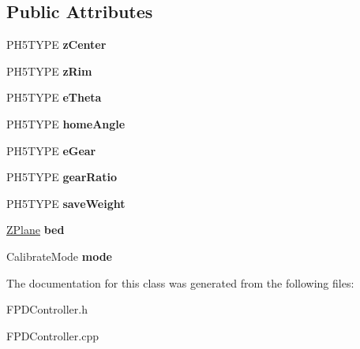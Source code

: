 \subsection*{Public Attributes}
\begin{DoxyCompactItemize}
\item 
\hypertarget{classfirestep_1_1_f_p_d_calibrate_home_aa7aa332ee4859b8646ae8cc9010c91b5}{P\+H5\+T\+Y\+P\+E {\bfseries z\+Center}}\label{classfirestep_1_1_f_p_d_calibrate_home_aa7aa332ee4859b8646ae8cc9010c91b5}

\item 
\hypertarget{classfirestep_1_1_f_p_d_calibrate_home_a012c0276dfa8cf8505490253790e5a79}{P\+H5\+T\+Y\+P\+E {\bfseries z\+Rim}}\label{classfirestep_1_1_f_p_d_calibrate_home_a012c0276dfa8cf8505490253790e5a79}

\item 
\hypertarget{classfirestep_1_1_f_p_d_calibrate_home_aabfe8245fdf7e3b80c6f0c4b18db718e}{P\+H5\+T\+Y\+P\+E {\bfseries e\+Theta}}\label{classfirestep_1_1_f_p_d_calibrate_home_aabfe8245fdf7e3b80c6f0c4b18db718e}

\item 
\hypertarget{classfirestep_1_1_f_p_d_calibrate_home_a9105696fde45b04c711c442a6392bd93}{P\+H5\+T\+Y\+P\+E {\bfseries home\+Angle}}\label{classfirestep_1_1_f_p_d_calibrate_home_a9105696fde45b04c711c442a6392bd93}

\item 
\hypertarget{classfirestep_1_1_f_p_d_calibrate_home_a386dd3229fe6b64d25150494048de8bf}{P\+H5\+T\+Y\+P\+E {\bfseries e\+Gear}}\label{classfirestep_1_1_f_p_d_calibrate_home_a386dd3229fe6b64d25150494048de8bf}

\item 
\hypertarget{classfirestep_1_1_f_p_d_calibrate_home_a15d05910bee5d2726f30b9c54f670ef8}{P\+H5\+T\+Y\+P\+E {\bfseries gear\+Ratio}}\label{classfirestep_1_1_f_p_d_calibrate_home_a15d05910bee5d2726f30b9c54f670ef8}

\item 
\hypertarget{classfirestep_1_1_f_p_d_calibrate_home_ae1fc3c7c8d9ab0621b84da772272b4a2}{P\+H5\+T\+Y\+P\+E {\bfseries save\+Weight}}\label{classfirestep_1_1_f_p_d_calibrate_home_ae1fc3c7c8d9ab0621b84da772272b4a2}

\item 
\hypertarget{classfirestep_1_1_f_p_d_calibrate_home_a78abd53e2a1abda12bbe0db21dc6674b}{\hyperlink{classfirestep_1_1_z_plane}{Z\+Plane} {\bfseries bed}}\label{classfirestep_1_1_f_p_d_calibrate_home_a78abd53e2a1abda12bbe0db21dc6674b}

\item 
\hypertarget{classfirestep_1_1_f_p_d_calibrate_home_a7e055a2a1a896bcbbaf7bbe631692cb5}{Calibrate\+Mode {\bfseries mode}}\label{classfirestep_1_1_f_p_d_calibrate_home_a7e055a2a1a896bcbbaf7bbe631692cb5}

\end{DoxyCompactItemize}


The documentation for this class was generated from the following files\+:\begin{DoxyCompactItemize}
\item 
F\+P\+D\+Controller.\+h\item 
F\+P\+D\+Controller.\+cpp\end{DoxyCompactItemize}

